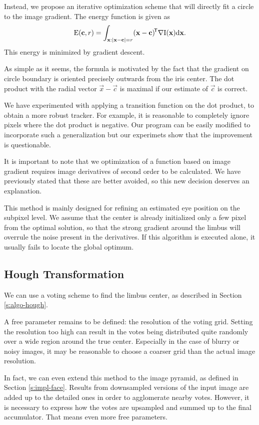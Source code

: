 Instead, we propose an iterative optimization scheme that will directly fit a circle to the image gradient.
The energy function is given as
\begin{equation}
\mathrm{E}(\mathbf{c}, r) = \int_{\mathbf{x}: |\mathbf{x} - \mathbf{c}| = r} (\mathbf{x} - \mathbf{c})^{\!\mathsf{T}} \nabla \mathrm{I} (\mathbf{x}) \mathrm{d}\mathbf{x}.
\end{equation}
This energy is minimized by gradient descent.

As simple as it seems, the formula is motivated by the fact that the gradient on circle boundary is oriented precisely outwards from the iris center.
The dot product with the radial vector $\vec x - \vec c$ is maximal if our estimate of $\vec c$ is correct.

We have experimented with applying a transition function on the dot product, to obtain a more robust tracker.
For example, it is reasonable to completely ignore pixels where the dot product is negative.
Our program can be easily modified to incorporate such a generalization but our experimets show that the improvement is questionable.

It is important to note that we optimization of a function based on image gradient requires image derivatives of second order to be calculated.
We have previously stated that these are better avoided, so this new decision deserves an explanation.

This method is mainly designed for refining an estimated eye position on the subpixel level.
We assume that the center is already initialized only a few pixel from the optimal solution, so that the strong gradient around the limbus will overrule the noise present in the derivatives.
If this algorithm is executed alone, it usually fails to locate the global optimum.

\subsection{Hough Transformation}
We can use a voting scheme to find the limbus center, as described in Section \ref{s:algo-hough}.

A free parameter remains to be defined: the resolution of the voting grid.
Setting the resolution too high can result in the votes being distributed quite randomly over a wide region around the true center.
Especially in the case of blurry or noisy images, it may be reasonable to choose a coarser grid than the actual image resolution.

In fact, we can even extend this method to the image pyramid, as defined in Section \ref{s:impl-face}.
Results from downsampled versions of the input image are added up to the detailed ones in order to agglomerate nearby votes.
However, it is necessary to express how the votes are upsampled and summed up to the final accumulator.
That means even more free parameters.

